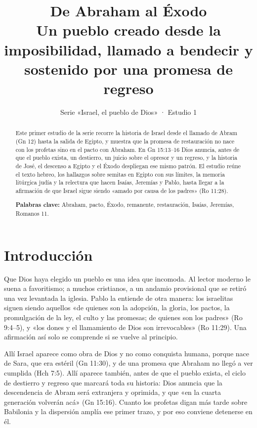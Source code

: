 \documentclass[11pt,letterpaper]{article}
\title{\color{ladrillo}\bfseries De Abraham al Éxodo\\[4pt]\large\color{cafe}\mdseries Un pueblo creado desde la imposibilidad, llamado a bendecir y sostenido por una promesa de regreso}
\author{}\date{\color{sepia}Serie «Israel, el pueblo de Dios» · Estudio 1}
\begin{document}
\maketitle\thispagestyle{empty}

\begin{abstract}\noindent
Este primer estudio de la serie recorre la historia de Israel desde el llamado de Abram (Gn 12) hasta la salida de Egipto, y muestra que la promesa de restauración no nace con los profetas sino en el pacto con Abraham. En Gn 15:13–16 Dios anuncia, antes de que el pueblo exista, un destierro, un juicio sobre el opresor y un regreso, y la historia de José, el descenso a Egipto y el Éxodo despliegan ese mismo patrón. El estudio reúne el texto hebreo, los hallazgos sobre semitas en Egipto con sus límites, la memoria litúrgica judía y la relectura que hacen Isaías, Jeremías y Pablo, hasta llegar a la afirmación de que Israel sigue siendo «amado por causa de los padres» (Ro 11:28).
\par\smallskip\noindent\textbf{Palabras clave:} Abraham, pacto, Éxodo, remanente, restauración, Isaías, Jeremías, Romanos 11.
\end{abstract}

\section{Introducción}

Que Dios haya elegido un pueblo es una idea que incomoda. Al lector moderno le suena a favoritismo; a muchos cristianos, a un andamio provisional que se retiró una vez levantada la iglesia. Pablo la entiende de otra manera: los israelitas siguen siendo aquellos «de quienes son la adopción, la gloria, los pactos, la promulgación de la ley, el culto y las promesas; de quienes son los padres» (Ro 9:4–5), y «los dones y el llamamiento de Dios son irrevocables» (Ro 11:29). Una afirmación así solo se comprende si se vuelve al principio.

Allí Israel aparece como obra de Dios y no como conquista humana, porque nace de Sara, que era estéril (Gn 11:30), y de una promesa que Abraham no llegó a ver cumplida (Hch 7:5). Allí aparece también, antes de que el pueblo exista, el ciclo de destierro y regreso que marcará toda su historia: Dios anuncia que la descendencia de Abram será extranjera y oprimida, y que «en la cuarta generación volverán acá» (Gn 15:16). Cuanto los profetas digan más tarde sobre Babilonia y la dispersión amplía ese primer trazo, y por eso conviene detenerse en él.
\end{document}
